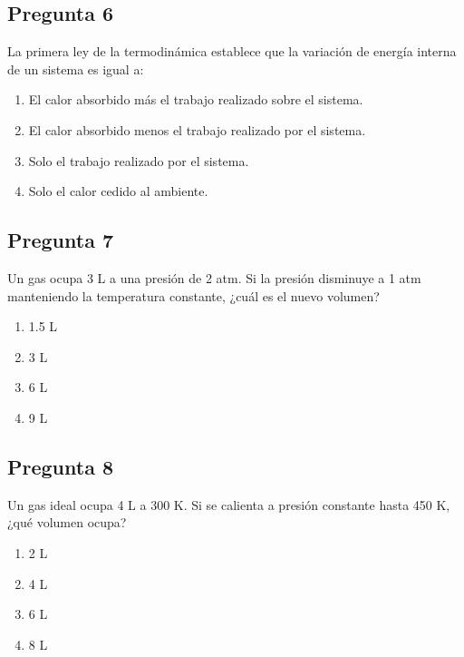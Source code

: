 \begin{preguntabox}
\subsection*{Pregunta 6}
La primera ley de la termodinámica establece que la variación de energía interna de un sistema es igual a:

\begin{enumerate}
    \item[A)] El calor absorbido más el trabajo realizado sobre el sistema.
    \item[B)] El calor absorbido menos el trabajo realizado por el sistema.
    \item[C)] Solo el trabajo realizado por el sistema.
    \item[D)] Solo el calor cedido al ambiente.
\end{enumerate}
\end{preguntabox}

\begin{preguntabox}
\subsection*{Pregunta 7}
Un gas ocupa 3 L a una presión de 2 atm. Si la presión disminuye a 1 atm manteniendo la temperatura constante, ¿cuál es el nuevo volumen?

\begin{enumerate}
    \item[A)] 1.5 L
    \item[B)] 3 L
    \item[C)] 6 L
    \item[D)] 9 L
\end{enumerate}
\end{preguntabox}

\begin{preguntabox}
\subsection*{Pregunta 8}
Un gas ideal ocupa 4 L a 300 K. Si se calienta a presión constante hasta 450 K, ¿qué volumen ocupa?

\begin{enumerate}
    \item[A)] 2 L
    \item[B)] 4 L
    \item[C)] 6 L
    \item[D)] 8 L
\end{enumerate}
\end{preguntabox}

